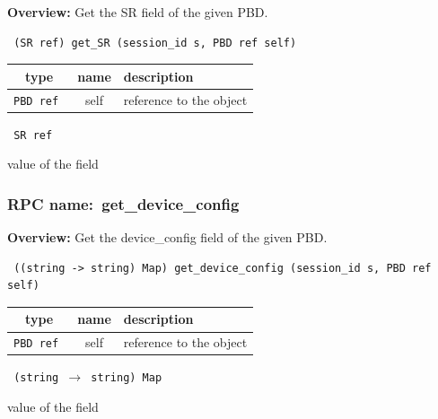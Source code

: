 {\bf Overview:} 
Get the SR field of the given PBD.

\begin{verbatim} (SR ref) get_SR (session_id s, PBD ref self)\end{verbatim}



 
\vspace{0.3cm}
\begin{tabular}{|c|c|p{7cm}|}
 \hline
{\bf type} & {\bf name} & {\bf description} \\ \hline
{\tt PBD ref } & self & reference to the object \\ \hline 

\end{tabular}

\vspace{0.3cm}

{\tt 
SR ref
}


value of the field
\vspace{0.3cm}
\vspace{0.3cm}
\vspace{0.3cm}
\subsubsection{RPC name:~get\_device\_config}

{\bf Overview:} 
Get the device\_config field of the given PBD.

\begin{verbatim} ((string -> string) Map) get_device_config (session_id s, PBD ref self)\end{verbatim}



 
\vspace{0.3cm}
\begin{tabular}{|c|c|p{7cm}|}
 \hline
{\bf type} & {\bf name} & {\bf description} \\ \hline
{\tt PBD ref } & self & reference to the object \\ \hline 

\end{tabular}

\vspace{0.3cm}

{\tt 
(string $\rightarrow$ string) Map
}


value of the field
\vspace{0.3cm}
\vspace{0.3cm}
\vspace{0.3cm}
